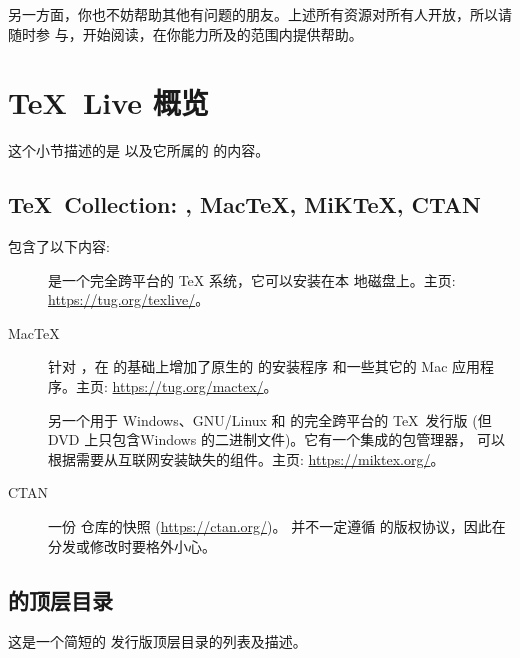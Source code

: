 \documentclass{article}
\begin{document}
另一方面，你也不妨帮助其他有问题的朋友。上述所有资源对所有人开放，所以请随时参
与，开始阅读，在你能力所及的范围内提供帮助。

\section{\protect\TeX\protect\ Live 概览}
\label{sec:overview-tl}

这个小节描述的是 \TL{} 以及它所属的 \TK{} 的内容。

\subsection{\protect\TeX\protect\ Collection: \protect\TL,
            Mac\protect\TeX, MiK\protect\TeX, CTAN}
\label{sec:tl-coll-dists}

\TK{} \DVD{} 包含了以下内容: 

\begin{description}

\item [\TL] 是一个完全跨平台的 \TeX{} 系统，它可以安装在本
地磁盘上。主页: \url{https://tug.org/texlive/}。

\item [Mac\TeX] 针对 \macOS{}，在 \TL{} 的基础上增加了原生的 \macOS{} 的安装程序
和一些其它的 Mac 应用程序。主页:  \url{https://tug.org/mactex/}。

\item [\MIKTEX] 另一个用于 Windows、GNU/Linux 和 \macOS{} 的完全跨平台的
\TeX\ 发行版 (但 DVD 上只包含Windows 的二进制文件)。它有一个集成的包管理器，
可以根据需要从互联网安装缺失的组件。主页: \url{https://miktex.org/}。

\item [CTAN] 一份 \CTAN{} 仓库的快照 (\url{https://ctan.org/})。
\CTAN{} 并不一定遵循 \TL{} 的版权协议，因此在分发或修改时要格外小心。

\end{description}

\subsection{\protect\TL{} 的顶层目录}
\label{sec:tld}

这是一个简短的 \TL{} 发行版顶层目录的列表及描述。
\end{document}
